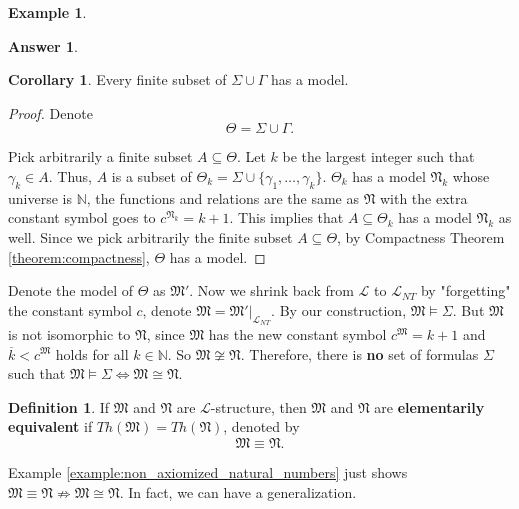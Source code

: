 \documentclass[11pt,letterpaper]{book}
\theoremstyle{definition}
\newtheorem{definition}{Definition}[section]
\newtheorem{corollary}{Corollary}[section]
\newtheorem{example}{Example}[section]
\newtheorem{answer}{Answer}[section]
\begin{document}
\begin{example}
\begin{answer}
\begin{corollary}
Every finite subset of $\Sigma \cup \Gamma$ has a model.
\end{corollary}


\begin{proof}

Denote $$\Theta = \Sigma \cup \Gamma .$$


Pick arbitrarily a finite subset $A \subseteq \Theta$. Let $k$ be the largest
integer such that $\gamma_k \in A$. Thus, $A $ is a subset of $\Theta_k
=  \Sigma \cup \{\gamma_1, \ldots, \gamma_k \} $. $ \Theta_k$ has a model $\mathfrak{N}_k$ whose universe is
$\mathbb{N}$, the functions and relations are the same as $\mathfrak{N}$
with the extra constant symbol goes to $c^{\mathfrak{N}_k} = k+1 $. This implies that $A \subseteq \Theta_k$ has a model $\mathfrak{N}_k$ as well. Since we pick arbitrarily the finite subset $A \subseteq \Theta $, by Compactness Theorem \ref{theorem:compactness}, $\Theta$ has a model.

\end{proof}

Denote the model of $\Theta$ as $\mathfrak{M}'$.  Now we shrink back from $\mathcal{L} $ to $\mathcal{L}_{NT}$ by
"forgetting" the constant symbol $c$, denote $\mathfrak{M} =
\mathfrak{M} ' | _{\mathcal{L}_{NT}}$. By our construction,
$\mathfrak{M} \models \Sigma$. But $\mathfrak{M}$ is not isomorphic to
$\mathfrak{N}$, since $\mathfrak{M}$ has the new constant symbol
$c^{\mathfrak{M}} =  k + 1$ and $\overline{k}  < c^{\mathfrak{M}} $
holds for all $k \in \mathbb{N}$. So $\mathfrak{M} \not \cong
\mathfrak{N} $. Therefore, there is \textbf{no} set of formulas $\Sigma$
such that $\mathfrak{M} \models \Sigma \iff \mathfrak{M} \cong
\mathfrak{N} $.

\end{answer}

\end{example}

\begin{definition}
If $\mathfrak{M}$ and $\mathfrak{N}$ are $\mathcal{L}$-structure, then
$\mathfrak{M}$ and $\mathfrak{N}$ are \textbf{elementarily equivalent} if
$Th(\mathfrak{M}) = Th(\mathfrak{N}) $, denoted by
$$ \mathfrak{M} \equiv \mathfrak{N}. $$
\end{definition}

Example \ref{example:non_axiomized_natural_numbers} just shows $
\mathfrak{M} \equiv \mathfrak{N} \not \Rightarrow \mathfrak{M} \cong
\mathfrak{N}  $. In fact, we can have a generalization.
\end{document}
